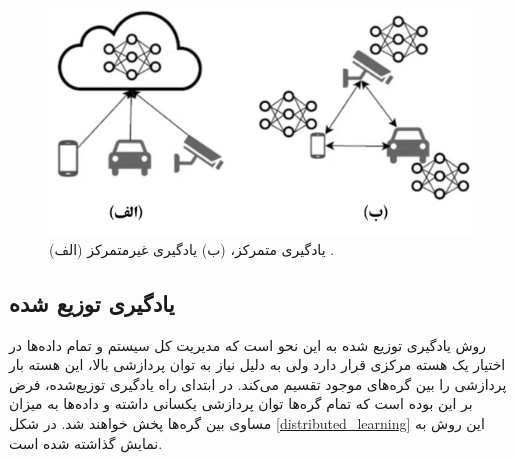 \begin{figure}[b]
	\centering
	\includegraphics[scale=0.8]{images/chap1/centralized_decentralized_learning.png}%
	\caption{%
		(الف) یادگیری متمرکز، (ب) یادگیری غیرمتمرکز
		\cite{zhou2019edge}%
		.
	}
	\label{centralized_decentralized_learning}
	\centering
\end{figure}


\subsection{یادگیری توزیع شده}
روش یادگیری توزیع شده%
به این نحو است که مدیریت کل سیستم و تمام داده‌ها در اختیار یک هسته مرکزی قرار دارد ولی به دلیل نیاز به توان پردازشی بالا، این هسته بار پردازشی را بین گره‌های موجود تقسیم می‌کند. در ابتدای راه یادگیری توزیع‌شده، فرض بر این بوده است که تمام گره‌ها توان پردازشی یکسانی داشته و داده‌ها به میزان مساوی بین گره‌ها پخش خواهند شد. در شکل
\ref{distributed_learning}
این روش به نمایش گذاشته شده است.


